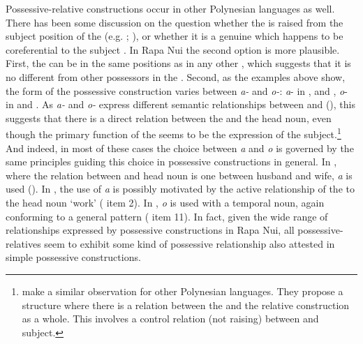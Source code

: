 Possessive-relative constructions occur in other Polynesian languages as well. There has been some discussion on the question whether the  is raised from the subject position of the  (e.g. \citealt[367]{Harlow2000}; \citealt[185]{Harlow2007Maori}), or whether it is a genuine   which happens to be coreferential to the  subject \citep[116]{Clark1976}. In Rapa Nui the second option is more plausible. First, the  can be in the same positions as in any other , which suggests that it is no different from other possessors in the . Second, as the examples above show, the form of the possessive construction varies between \textit{a-} and \textit{o-}: \textit{a}{}- in ,  and , \textit{o}{}- in  and . As \textit{a-} and \textit{o-} express different semantic relationships between  and  (), this suggests that there is a direct relation between the  and the head noun, even though the primary function of the  seems to be the expression of the  subject.\footnote{\label{fn:517}\citet{HerdMacdonald2011} make a similar observation for other Polynesian languages. They propose a structure where there is a relation between the  and the relative construction as a whole. This involves a control relation (not raising) between  and  subject.} And indeed, in most of these cases the choice between \textit{{\ꞌ}a} and \textit{o} is governed by the same principles guiding this choice in possessive constructions in general. In , where the relation between  and head noun is one between husband and wife, \textit{{\ꞌ}a} is used (). In , the use of \textit{{\ꞌ}a} is possibly motivated by the active relationship of the  to the head noun ‘work’ ( item 2). In , \textit{o} is used with a temporal noun, again conforming to a general pattern ( item 11). In fact, given the wide range of relationships expressed by possessive constructions in Rapa Nui, all possessive-relatives seem to exhibit some kind of possessive relationship also attested in simple possessive constructions.


